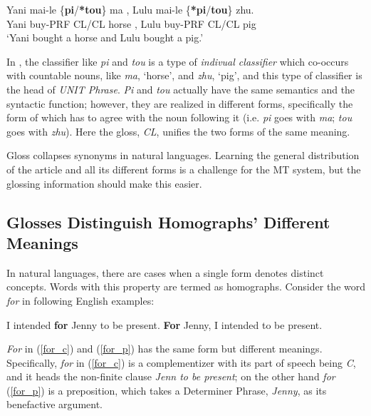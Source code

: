 \documentclass[final]{ua-thesis}
\numberwithin{equation}{section}
\begin{document}
\begin{exe}
\ex \label{chinese_cl_eg}
\gll Yani mai-le \{\textbf{pi}/\textbf{*tou}\} ma , Lulu mai-le \{\textbf{*pi}/\textbf{tou}\} zhu.\\ 
Yani buy-PRF CL/CL horse , Lulu buy-PRF CL/CL pig\\
\glt `Yani bought a horse and Lulu bought a pig.' \citep[p. 136]{zhang2013classifier}
\end{exe}

In \citet{zhang2013classifier}, the classifier like \textit{pi} and \textit{tou} is a type of \textit{indivual classifier} which co-occurs with countable nouns, like \textit{ma}, `horse', and \textit{zhu}, `pig', and this type of classifier is the head of \textit{UNIT Phrase}. 
\textit{Pi} and \textit{tou} actually have the same semantics and the syntactic function; however, they are realized in different forms, specifically the form of which has to agree with the noun following it (i.e. \textit{pi} goes with \textit{ma}; \textit{tou} goes with \textit{zhu}). Here the gloss, \textit{CL}, unifies the two forms of the same meaning.    

Gloss collapses synonyms in natural languages. Learning the general distribution of the article and all its different forms is a challenge for the MT system, but the glossing information should make this easier.

\subsection{Glosses Distinguish Homographs' Different Meanings}\label{sec:disa}

In natural languages, there are cases when a single form denotes distinct concepts. Words with this property are termed as homographs. Consider the word \textit{for} in following English examples:

\begin{exe}
\ex \label{for_eng}
	\begin{xlist}
	\ex \label{for_c}I intended \textbf{for} Jenny to be present.
	\ex \label{for_p}\textbf{For} Jenny, I intended to be present. \citep[p.306-307]{adger2003core}
	\end{xlist}
\end{exe}

\textit{For} in (\ref{for_c}) and (\ref{for_p}) has the same form but different meanings. Specifically, \textit{for} in (\ref{for_c}) is a complementizer with its part of speech being \textit{C}, and it heads the non-finite clause \textit{Jenn to be present}; on the other hand \textit{for} (\ref{for_p}) is a preposition, which takes a Determiner Phrase, \textit{Jenny}, as its benefactive argument.   
\end{document}
